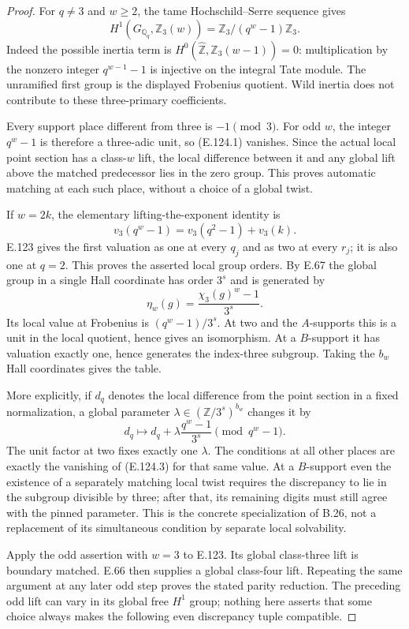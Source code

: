 \begin{proof}
For $q\ne3$ and $w\geq2$, the tame Hochschild--Serre
sequence gives
\[
 H^1(G_{\mathbb Q_q},\mathbb Z_3(w))
       =\mathbb Z_3/(q^w-1)\mathbb Z_3.
 \tag{E.124.1}
\]
Indeed the possible inertia term is
$H^0(\widehat{\mathbb Z},\mathbb Z_3(w-1))=0$:
multiplication by the nonzero integer $q^{w-1}-1$ is
injective on the integral Tate module. The unramified first
group is the displayed Frobenius quotient. Wild inertia
does not contribute to these three-primary coefficients.

Every support place different from three is $-1\pmod3$.
For odd $w$, the integer $q^w-1$ is therefore a three-adic
unit, so (E.124.1) vanishes. Since the actual local point
section has a class-$w$ lift, the local difference between
it and any global lift above the matched predecessor lies
in the zero group. This proves automatic matching at each
such place, without a choice of a global twist.

If $w=2k$, the elementary lifting-the-exponent identity is
\[
 v_3(q^w-1)=v_3(q^2-1)+v_3(k).
 \tag{E.124.2}
\]
E.123 gives the first valuation as one at every $q_j$ and
as two at every $r_j$; it is also one at $q=2$. This proves
the asserted local group orders. By E.67 the global group
in a single Hall coordinate has order $3^s$ and is generated
by
\[
 \eta_w(g)=\frac{\chi_3(g)^w-1}{3^s}.
\]
Its local value at Frobenius is
$(q^w-1)/3^s$. At two and the $A$-supports this is a unit
in the local quotient, hence gives an isomorphism. At a
$B$-support it has valuation exactly one, hence generates
the index-three subgroup. Taking the $b_w$ Hall coordinates
gives the table.

More explicitly, if $d_q$ denotes the local difference
from the point section in a fixed normalization, a global
parameter $\lambda\in(\mathbb Z/3^s)^{b_w}$ changes it by
\[
 d_q\longmapsto d_q+
       \lambda\frac{q^w-1}{3^s}
       \pmod{q^w-1}.
 \tag{E.124.3}
\]
The unit factor at two fixes exactly one $\lambda$. The
conditions at all other places are exactly the vanishing
of (E.124.3) for that same value. At a $B$-support even the
existence of a separately matching local twist requires
the discrepancy to lie in the subgroup divisible by three;
after that, its remaining digits must still agree with
the pinned parameter. This is the concrete specialization
of B.26, not a replacement of its simultaneous condition
by separate local solvability.

Apply the odd assertion with $w=3$ to E.123. Its global
class-three lift is boundary matched. E.66 then supplies
a global class-four lift. Repeating the same argument at
any later odd step proves the stated parity reduction.
The preceding odd lift can vary in its global free
$H^1$ group; nothing here asserts that some choice always
makes the following even discrepancy tuple compatible.
\end{proof}

